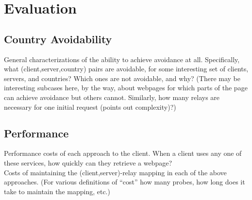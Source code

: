 \section{Evaluation}
\label{evaluation}

\subsection{Country Avoidability}
General characterizations of the ability to achieve avoidance at all. Specifically, what (client,server,country) pairs are avoidable, for some interesting set of clients, servers, and countries? Which ones are not avoidable, and why?  (There may be interesting subcases here, by the way, about webpages for which parts of the page can achieve avoidance but others cannot.  Similarly, how many relays are necessary for one initial request (points out complexity)?)

\subsection{Performance}
Performance costs of each approach to the client. When a client uses any one of these services, how quickly can they retrieve a webpage?
\\
Costs of maintaining the (client,server)-relay mapping in each of the above approaches. (For various definitions of ``cost'' how many probes, how long does it take to maintain the mapping, etc.)
